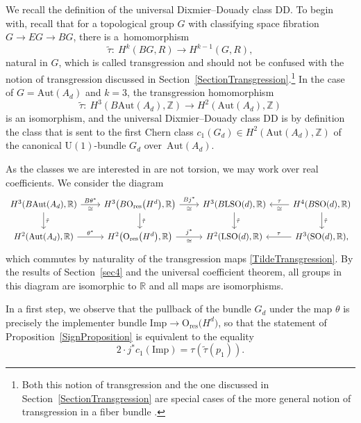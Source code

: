 \documentclass[11pt]{article}
\numberwithin{equation}{section}
\numberwithin{equation}{section}
\newcommand{\R}{\mathbb{R}}
\newcommand{\Z}{\mathbb{Z}}
\newcommand{\SO}{\mathrm{SO}}
\newcommand{\res}{\mathrm{res}}
\newcommand{\Aut}{\mathrm{Aut}}
\newcommand{\Imp}{\mathrm{Imp}}
\newcommand{\U}{\mathrm{U}}
\renewcommand{\O}{\mathrm{O}}
\renewcommand{\L}{\mathrm{L}}
\newcommand{\DD}{\mathrm{DD}}
\begin{document}
We recall the definition of the universal Dixmier--Douady class $\DD$.
To begin with, recall that for a topological group $G$ with classifying space fibration $G \to EG \to BG$, there is a~homomorphism
\begin{equation*}
 \tilde{\tau} \colon\ H^k(BG, R) \longrightarrow H^{k-1}(G, R),
\end{equation*}
natural in $G$, which is called transgression and should not be confused with the notion of transgression discussed in Section~\ref{SectionTransgression}.\footnote{Both this notion of transgression and the one discussed in Section~\ref{SectionTransgression} are special cases of the more general notion of transgression in a fiber bundle \cite{Borel}.}
In the case of $G = \Aut(A_d)$ and $k=3$, the transgression homomorphism
\begin{equation}
\label{TildeTransgression}
\tilde{\tau} \colon\ H^3(B\Aut(A_d), \Z) \longrightarrow H^2(\Aut(A_d), \Z)	
\end{equation}
is an isomorphism, and the universal Dixmier--Douady class $\DD$ is by definition the class that is sent to the first Chern class $c_1(G_d) \in H^2(\Aut(A_d), \Z)$ of the canonical $\U(1)$-bundle $G_d$ over~$\Aut(A_d)$.




As the classes we are interested in are not torsion, we may work over real coefficients.
We consider the diagram
\begin{equation*}
\begin{tikzcd}[column sep=0.8cm]
H^3(B\Aut(A_d), \R)
	\ar[r, "B\theta^*", "\cong"']
	\ar[d, "\tilde{\tau}"]
&
H^3\big(B\O_{\res}\big(H^d\big), \R\big)
	\ar[r, "Bj^*", "\cong"']
	\ar[d, "\tilde{\tau}"]
&
H^3(B\L\SO(d), \R)
	\ar[d, "\tilde{\tau}"]
&
H^4(B\SO(d), \R)
\ar[l, "\tau"', "\cong"]
	\ar[d, "\tilde{\tau}"]
\\
H^2(\Aut(A_d), \R)
	\ar[r, "\theta^*"]
&
H^2\big(\O_{\res}\big(H^d\big), \R\big)
	\ar[r, "j^*", "\cong"']
&
H^2(\L \SO(d), \R)
&
H^3(\SO(d), \R),
\ar[l, "\tau"']
\end{tikzcd}
\end{equation*}
which commutes by naturality of the transgression maps \eqref{TildeTransgression}.
By the results of Section~\ref{sec4} and the universal coefficient theorem, all groups in this diagram are isomorphic to $\R$ and all maps are isomorphisms.

In a first step, we observe that the pullback of the bundle $G_d$ under the map $\theta$ is precisely the implementer bundle $\Imp \to \O_{\mathrm{res}}\big(H^d\big)$, so that the statement of Proposition~\ref{SignProposition} is equivalent to the equality
\begin{equation*}
	2\cdot j^*c_1(\Imp) = \tau (\tilde{\tau}(p_1)).
\end{equation*}
\end{document}
